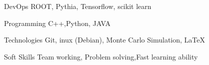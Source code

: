 

\begin{cvskills}

  \cvskill
    {DevOps} %
    {ROOT, Pythia, Tensorflow, scikit learn} %


  \cvskill
    {Programming} %
    {C++,Python, JAVA} %

  \cvskill
    {Technologies} %
    {Git, inux (Debian), Monte Carlo Simulation, \LaTeX} %

      \cvskill
    {Soft Skills} %
    {Team working, Problem solving,Fast learning ability} %


\end{cvskills}

